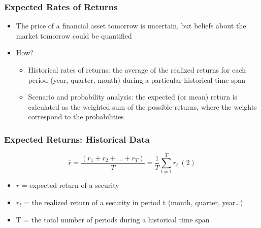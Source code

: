 \documentclass[9pt,aspectratio=169]{beamer}
\begin{document}
\begin{frame}
\frametitle{\textnormal{Expected Rates of  Returns}}

\begin{itemize}
    \item The price of a financial asset tomorrow is uncertain, but beliefs about the market tomorrow could be quantified
\item How?
\begin{itemize}

\item [-]Historical rates of returns: the average of the realized returns for each period (year, quarter, month) during a particular historical time span

\item [-]Scenario and probability analysis: the expected (or mean) return is calculated as the weighted sum of the possible returns, where the weights correspond to the probabilities

\end{itemize}

\end{itemize}

\end{frame}

\begin{frame}
\frametitle{\textnormal{Expected Returns: Historical Data}}

$$
    \bar{r}=\frac{(r_1+r_2+\dots+r_T)}{T} =\frac{1}{T}\sum_{t=1}^T r_t  \ (2)
  $$

\begin{itemize}
    \item $\bar{r}$ = expected return of a security
\item $r_t$ = the realized return of a security in period t (month, quarter, year…)
\item T = the total number of periods during a historical time span

\end{itemize}

\end{frame}
\end{document}
